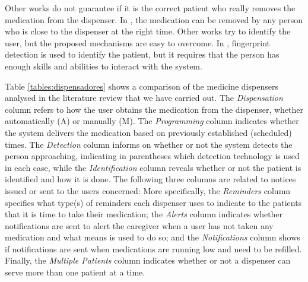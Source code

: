 \documentclass{IOS-Book-Article}
\begin{document}
Other works do not guarantee if it is the correct patient who really removes the medication from the dispenser. In \cite{r17,r19}, the medication can be removed by any person who is close to the dispenser at the right time. Other works \cite{r7,r21,r22} try to identify the user, but the proposed mechanisms are easy to overcome. In \cite{r9}, fingerprint detection is used to identify the patient, but it requires that the person has enough skills and abilities to interact with the system.

Table \ref{tables:dispensadores} shows a comparison of the medicine dispensers analysed in the literature review that we have carried out. The \textit{Dispensation} column refers to how the user obtains the medication from the dispenser, whether automatically (A) or manually (M). The \textit{Programming} column indicates whether the system delivers the medication based on previously established (scheduled) times. The \textit{Detection} column informs on whether or not the system detects the person approaching, indicating in parentheses which  detection technology is used in each case, while the \textit{Identification} column reveals whether or not the patient is identified and how it is done. The following three columns are related to notices issued or sent to the users concerned: More specifically, the \textit{Reminders} column specifies what type(s) of reminders each dispenser uses to indicate to the patients that it is time to take their medication; the \textit{Alerts} column indicates whether notifications are sent to alert the caregiver when a user has not taken any medication and what means is used to do so; and the \textit{Notifications} column shows if notifications are sent when medications are running low and need to be refilled. Finally, the \textit{Multiple Patients} column indicates whether or not a dispenser can serve more than one patient at a time.
\end{document}
